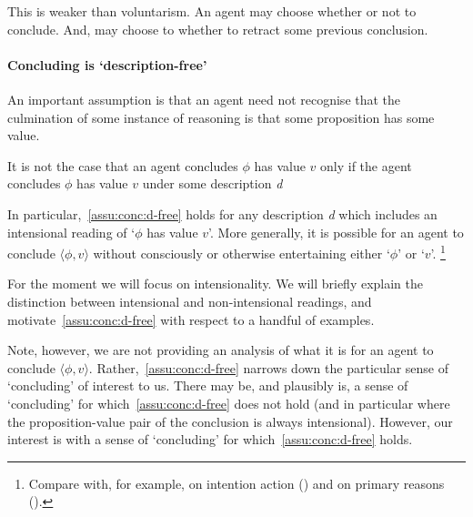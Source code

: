 \begin{note}
  This is weaker than voluntarism.
  An agent may choose whether or not to conclude.
  And, may choose to whether to retract some previous conclusion.
\end{note}

\paragraph*{Concluding is `description-free'}

\begin{note}[Descriptions]
  An important assumption is that an agent need not recognise that the culmination of some instance of reasoning is that some proposition has some value.

  \begin{assumption}
    \label{assu:conc:d-free}
    It is not the case that an agent concludes \(\phi\) has value \(v\) only if the agent concludes \(\phi\) has value \(v\) under some description \emph{d}
  \end{assumption}

  In particular,~\autoref{assu:conc:d-free} holds for any description \emph{d} which includes an intensional reading of `\(\phi\) has value \(v\)'.
  More generally, it is possible for an agent to conclude \(\langle \phi,v \rangle\) without consciously or otherwise entertaining either `\(\phi\)' or `\(v\)'.%
  \footnote{
    Compare with, for example, \citeauthor{Anscombe:1957aa} on intention action (\citeyear[\S19]{Anscombe:1957aa}) and \citeauthor{Davidson:1963aa} on primary reasons (\citeyear[5]{Davidson:1963aa}).
  }

  For the moment we will focus on intensionality.
  We will briefly explain the distinction between intensional and non-intensional readings, and motivate~\autoref{assu:conc:d-free} with respect to a handful of examples.

  Note, however, we are not providing an analysis of what it is for an agent to conclude \(\langle \phi,v \rangle\).
  Rather,~\autoref{assu:conc:d-free} narrows down the particular sense of `concluding' of interest to us.
  There may be, and plausibly is, a sense of `concluding' for which~\autoref{assu:conc:d-free} does not hold (and in particular where the proposition-value pair of the conclusion is always intensional).
  However, our interest is with a sense of `concluding' for which~\autoref{assu:conc:d-free} holds.
\end{note}

